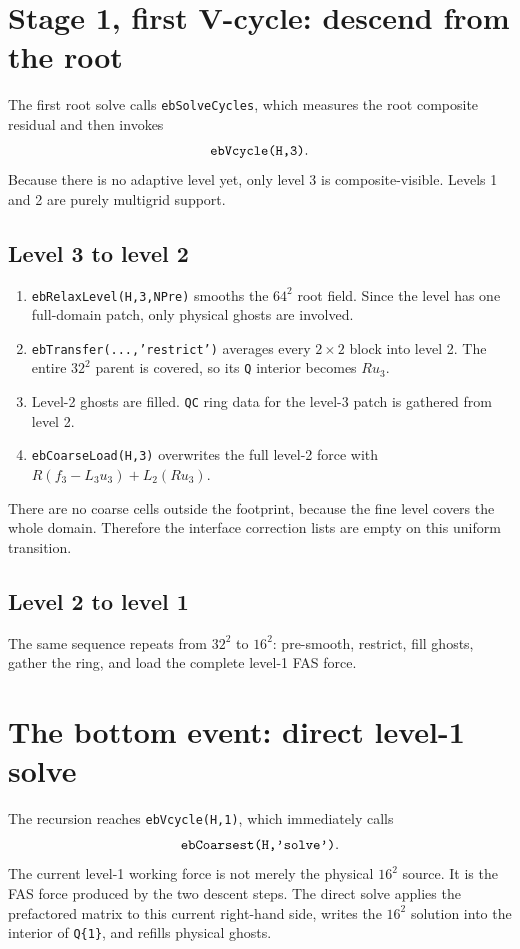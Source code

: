 \documentclass[11pt,oneside,openany]{book}
\newcommand{\code}[1]{\textnormal{\texttt{#1}}}
\begin{document}
\section{Stage 1, first V-cycle: descend from the root}
The first root solve calls \code{ebSolveCycles}, which measures the root composite residual and then invokes
\[
  \code{ebVcycle(H,3)}.
\]
Because there is no adaptive level yet, only level 3 is composite-visible. Levels 1 and 2 are purely multigrid support.

\subsection{Level 3 to level 2}
\begin{enumerate}[label=\arabic*.]
\item \code{ebRelaxLevel(H,3,NPre)} smooths the $64^2$ root field. Since the level has one full-domain patch, only physical ghosts are involved.
\item \code{ebTransfer(...,'restrict')} averages every $2\times2$ block into level 2. The entire $32^2$ parent is covered, so its \code{Q} interior becomes $Ru_3$.
\item Level-2 ghosts are filled. \code{QC} ring data for the level-3 patch is gathered from level 2.
\item \code{ebCoarseLoad(H,3)} overwrites the full level-2 force with
$R(f_3-L_3u_3)+L_2(Ru_3)$.
\end{enumerate}
There are no coarse cells outside the footprint, because the fine level covers the whole domain. Therefore the interface correction lists are empty on this uniform transition.

\subsection{Level 2 to level 1}
The same sequence repeats from $32^2$ to $16^2$: pre-smooth, restrict, fill ghosts, gather the ring, and load the complete level-1 FAS force.

\section{The bottom event: direct level-1 solve}
The recursion reaches \code{ebVcycle(H,1)}, which immediately calls
\[
 \code{ebCoarsest(H,'solve')}.
\]
The current level-1 working force is not merely the physical $16^2$ source. It is the FAS force produced by the two descent steps. The direct solve applies the prefactored matrix to this current right-hand side, writes the $16^2$ solution into the interior of \code{Q\{1\}}, and refills physical ghosts.
\end{document}
